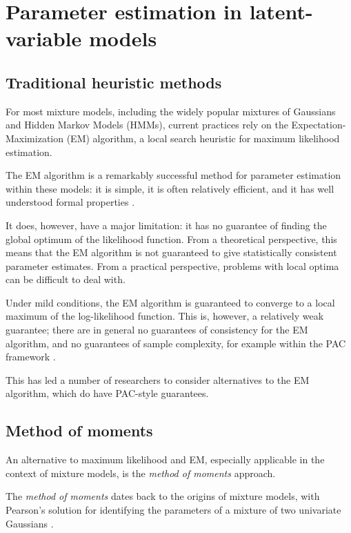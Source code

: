 \section{Parameter estimation in latent-variable models}

\subsection{Traditional heuristic methods}

For most mixture models, including the widely popular mixtures of Gaussians and Hidden
Markov Models (HMMs), current practices rely on the Expectation-Maximization (EM) algorithm,
a local search heuristic for maximum likelihood estimation.

The EM algorithm is a remarkably successful
method for parameter estimation within these models: it is simple, it is often relatively
efficient, and it has well understood formal properties \cite{ref19}. 

It does, however, have a major limitation: it has no guarantee of finding the global optimum of the likelihood function.
From a theoretical perspective, this means that the EM algorithm is not guaranteed to give
statistically consistent parameter estimates. From a practical perspective, problems with
local optima can be difficult to deal with.

Under mild conditions,
the EM algorithm is guaranteed to converge to a local maximum of the log-likelihood
function. This is, however, a relatively weak guarantee; there are in general no guarantees
of consistency for the EM algorithm, and no guarantees of sample complexity, for example
within the PAC framework \cite{ref19}. 

This has led a number of researchers to consider
alternatives to the EM algorithm, which do have PAC-style guarantees.






\subsection{Method of moments}

An alternative to maximum likelihood and EM, especially applicable in the context of mixture models,
is the \textit{method of moments} approach.

The \textit{method of moments} dates back to the origins of mixture
models, with Pearson’s solution for identifying the parameters of a mixture of two univariate
Gaussians \cite{ref5}. 

